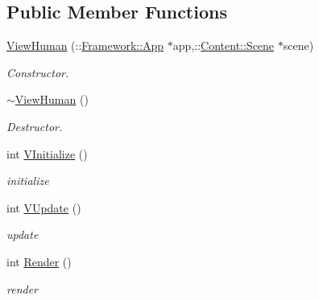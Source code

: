 \subsection*{Public Member Functions}
\begin{DoxyCompactItemize}
\item 
\hypertarget{classContent_1_1ViewHuman_a3fc355c749d909c41a9dedd8406c8ccc}{
\hyperlink{classContent_1_1ViewHuman_a3fc355c749d909c41a9dedd8406c8ccc}{ViewHuman} (::\hyperlink{classFramework_1_1App}{Framework::App} $\ast$app,::\hyperlink{classContent_1_1Scene}{Content::Scene} $\ast$scene)}
\label{classContent_1_1ViewHuman_a3fc355c749d909c41a9dedd8406c8ccc}

\begin{DoxyCompactList}\small\item\em Constructor. \item\end{DoxyCompactList}\item 
\hypertarget{classContent_1_1ViewHuman_a8c7129bc937c73fa5dde33d4ed72647e}{
\hyperlink{classContent_1_1ViewHuman_a8c7129bc937c73fa5dde33d4ed72647e}{$\sim$ViewHuman} ()}
\label{classContent_1_1ViewHuman_a8c7129bc937c73fa5dde33d4ed72647e}

\begin{DoxyCompactList}\small\item\em Destructor. \item\end{DoxyCompactList}\item 
\hypertarget{classContent_1_1ViewHuman_a2e5a42385109e20183c43a781dceebd5}{
int \hyperlink{classContent_1_1ViewHuman_a2e5a42385109e20183c43a781dceebd5}{VInitialize} ()}
\label{classContent_1_1ViewHuman_a2e5a42385109e20183c43a781dceebd5}

\begin{DoxyCompactList}\small\item\em initialize \item\end{DoxyCompactList}\item 
\hypertarget{classContent_1_1ViewHuman_ab127ae592e6ce339c13ad65b130cbe66}{
int \hyperlink{classContent_1_1ViewHuman_ab127ae592e6ce339c13ad65b130cbe66}{VUpdate} ()}
\label{classContent_1_1ViewHuman_ab127ae592e6ce339c13ad65b130cbe66}

\begin{DoxyCompactList}\small\item\em update \item\end{DoxyCompactList}\item 
\hypertarget{classContent_1_1ViewHuman_a2ebf2b711d1341e10c540796ed3c17e9}{
int \hyperlink{classContent_1_1ViewHuman_a2ebf2b711d1341e10c540796ed3c17e9}{Render} ()}
\label{classContent_1_1ViewHuman_a2ebf2b711d1341e10c540796ed3c17e9}

\begin{DoxyCompactList}\small\item\em render \item\end{DoxyCompactList}\end{DoxyCompactItemize}


